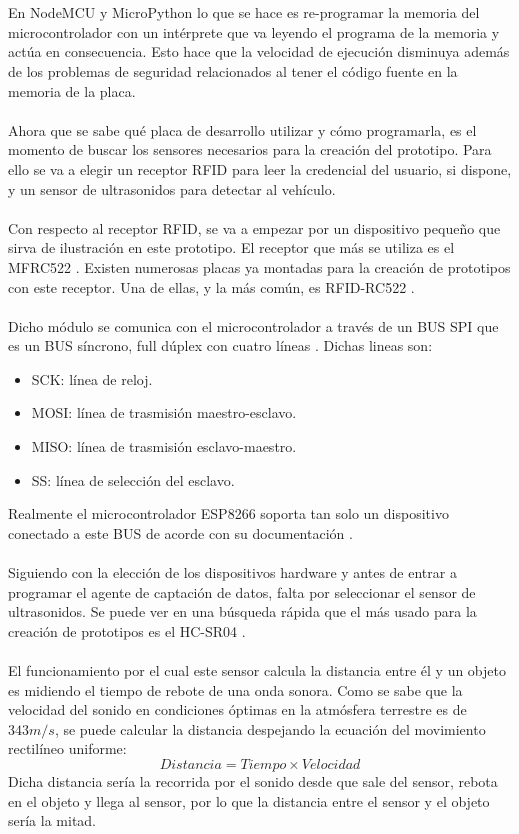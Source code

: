 \\\\
En NodeMCU y MicroPython lo que se hace es re-programar la memoria del microcontrolador con un intérprete que va leyendo el programa de la memoria y actúa en consecuencia. Esto hace que la velocidad de ejecución disminuya además de los problemas de seguridad relacionados al tener el código fuente en la memoria de la placa.
\\\\
Ahora que se sabe qué placa de desarrollo utilizar y cómo programarla, es el momento de buscar los sensores necesarios para la creación del prototipo. Para ello se va a elegir un receptor RFID para leer la credencial del usuario, si dispone, y un sensor de ultrasonidos para detectar al vehículo. 
\\\\
Con respecto al receptor RFID, se va a empezar por un dispositivo pequeño que sirva de ilustración en este prototipo. El receptor que más se utiliza es el MFRC522 \cite{rfid-especs}. Existen numerosas placas ya montadas para la creación de prototipos con este receptor. Una de ellas, y la más común, es RFID-RC522 \cite{rfid-modulo}.
\\\\
Dicho módulo se comunica con el microcontrolador a través de un BUS SPI que es un BUS síncrono, full dúplex con cuatro líneas \cite{spi}. Dichas lineas son:
\begin{itemize}
	\item SCK: línea de reloj.
	\item MOSI: línea de trasmisión maestro-esclavo.
	\item MISO: línea de trasmisión esclavo-maestro.
	\item SS: línea de selección del esclavo.
\end{itemize}
Realmente el microcontrolador ESP8266 soporta tan solo un dispositivo conectado a este BUS de acorde con su documentación \cite{esp8266-pins}.
\\\\
Siguiendo con la elección de los dispositivos hardware y antes de entrar a programar el agente de captación de datos, falta por seleccionar el sensor de ultrasonidos. Se puede ver en una búsqueda rápida que el más usado para la creación de prototipos es el HC-SR04 \cite{hcsr04}.
\\\\
El funcionamiento por el cual este sensor calcula la distancia entre él y un objeto es midiendo el tiempo de rebote de una onda sonora. Como se sabe que la velocidad del sonido en condiciones óptimas en la atmósfera terrestre es de $343m/s$, se puede calcular la distancia despejando la ecuación del movimiento rectilíneo uniforme: $$Distancia = Tiempo \times Velocidad$$ Dicha distancia sería la recorrida por el sonido desde que sale del sensor, rebota en el objeto y llega al sensor, por lo que la distancia entre el sensor y el objeto sería la mitad.
